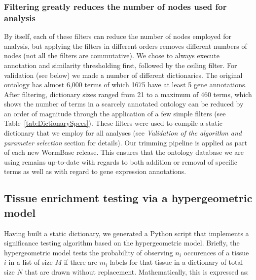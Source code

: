 \subsubsection*{Filtering greatly reduces the number of nodes used for analysis}
By itself, each of these filters can reduce the number of nodes employed for
analysis, but applying the filters in different orders removes different numbers
of nodes (not all the filters are commutative). We chose to always execute
annotation and similarity thresholding first, followed by the ceiling filter.
For validation (see below) we made a number of different dictionaries. The
original ontology has almost 6,000 terms of which 1675 have at least 5 gene
annotations. After filtering, dictionary sizes ranged from 21 to a maximum of
460 terms, which shows the number of terms in a scarcely annotated ontology can
be reduced by an order of magnitude through the application of a few simple
filters (see Table~\ref{tab:DictionarySpecs}). These filters were used to compile
a static dictionary that we employ for all analyses (see \emph{Validation of the
algorithm and parameter selection} section for details). Our trimming pipeline is
applied as part of each new WormBase release. This ensures that the ontology
database we are using remains up-to-date with regards to both addition or removal
of specific terms as well as with regard to gene expression annotations.


\subsection*{Tissue enrichment testing via a hypergeometric model}
Having built a static dictionary, we generated a Python script that implements a
significance testing algorithm based on the hypergeometric model. Briefly, the
hypergeometric model tests the probability of observing $n_i$ occurences of a
tissue $i$ in a list of size $M$ if there are $m_i$ labels for that tissue in a
dictionary of total size $N$ that are drawn without replacement. Mathematically,
this is expressed as:

